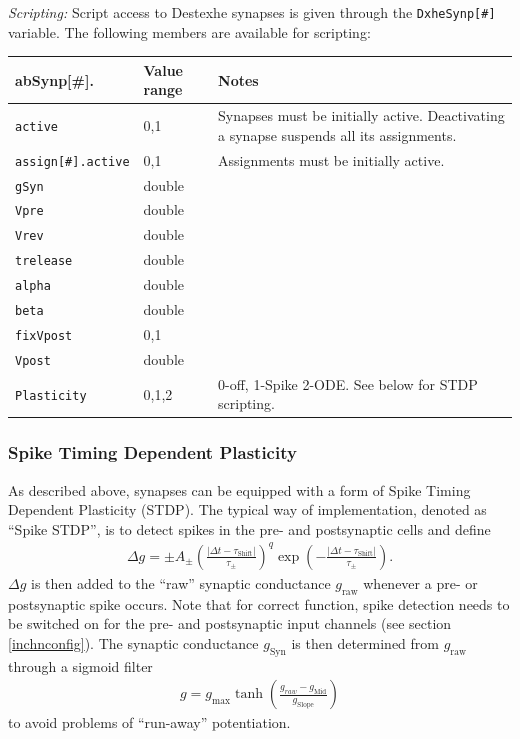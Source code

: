 \documentclass{article}
\begin{document}
\noindent
\emph{Scripting:} Script access to Destexhe synapses is given through the \texttt{DxheSynp[\#]} variable.
The following members are available for scripting: \\
\begin{tabularx}{\linewidth}{|ll|X|}
	\hline
	{\bf abSynp[\#].\textvisiblespace} & {\bf Value range} & {\bf Notes} \\
	\hline
	\texttt{active} & 0,1 & Synapses must be initially active. Deactivating a synapse suspends all
	its assignments. \\
	\texttt{assign[\#].active} & 0,1 & Assignments must be initially active. \\
	\texttt{gSyn} & double & \\
	\texttt{Vpre} & double & \\
	\texttt{Vrev} & double & \\
	\texttt{trelease} & double & \\
	\texttt{alpha} & double & \\
	\texttt{beta} & double & \\
	\texttt{fixVpost} & 0,1 & \\
	\texttt{Vpost} & double & \\
	\texttt{Plasticity} & 0,1,2 & 0-off, 1-Spike 2-ODE. See below for STDP scripting. \\
	\hline
\end{tabularx}

\subsubsection{Spike Timing Dependent Plasticity} \label{STDP}
As described above, synapses can be equipped with a form of Spike
Timing Dependent Plasticity (STDP).
The typical way of implementation, denoted as ``Spike STDP'',
is to detect spikes in the pre- and postsynaptic cells and 
define 
  \begin{align}
    \Delta g= \pm A_{\pm} \left(\frac{|\Delta t -
      \tau_{\text{Shift}}|}{\tau_{\pm}}\right)^q
    \exp\left(-\frac{|\Delta t -
      \tau_{\text{Shift}}|}{\tau_{\pm}}\right) .
  \end{align}
$\Delta g$ is then added to the ``raw'' synaptic conductance
$g_{\text{raw}}$ whenever a pre- or postsynaptic spike occurs. Note
that for correct function, spike detection needs to be switched on
for the pre- and postsynaptic input channels (see section \ref{inchnconfig}).
The synaptic conductance $g_{\text{Syn}}$ is then
determined from $g_{\text{raw}}$ through a sigmoid filter
\begin{align}
  g= g_{\text{max}} \tanh\left(\frac{g_{raw} -
    g_{\text{Mid}}}{g_{\text{Slope}}}\right) 
\end{align}
to avoid problems of ``run-away'' potentiation.
\end{document}
